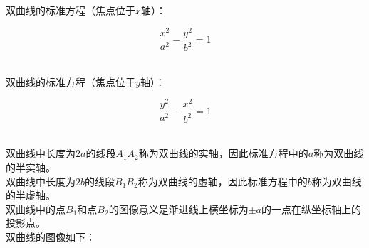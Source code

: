 \documentclass[UTF8]{ctexart}
\begin{document}
\newpage

    双曲线的标准方程（焦点位于$x$轴）：
    \begin{large}
        \begin{equation*}
            \frac{x^2}{a^2}-\frac{y^2}{b^2}=1
        \end{equation*}
    \end{large}\\
    双曲线的标准方程（焦点位于$y$轴）：
    \begin{large}
        \begin{equation*}
            \frac{y^2}{a^2}-\frac{x^2}{b^2}=1
        \end{equation*}
    \end{large}\\
    双曲线中长度为$2a$的线段$A_1A_2$称为双曲线的实轴，因此标准方程中的$a$称为双曲线的半实轴。\\[3mm]
    双曲线中长度为$2b$的线段$B_1B_2$称为双曲线的虚轴，因此标准方程中的$b$称为双曲线的半虚轴。\\[3mm]
    双曲线中的点$B_1$和点$B_2$的图像意义是渐进线上横坐标为$\pm a$的一点在纵坐标轴上的投影点。\\[5mm]
    双曲线的图像如下：
\end{document}
